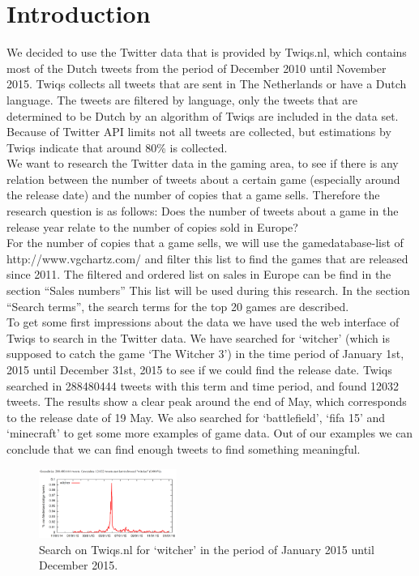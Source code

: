 \section{Introduction}
We decided to use the Twitter data that is provided by Twiqs.nl, which contains most of the Dutch tweets from the period of December 2010 until November 2015. Twiqs collects all tweets that are sent in The Netherlands or have a Dutch language. The tweets are filtered by language, only the tweets that are determined to be Dutch by an algorithm of Twiqs are included in the data set. Because of Twitter API limits not all tweets are collected, but estimations by Twiqs indicate that around 80\% is collected.\\
We want to research the Twitter data in the gaming area, to see if there is any relation between the number of tweets about a certain game (especially around the release date) and the number of copies that a game sells. Therefore the research question is as follows:
Does the number of tweets about a game in the release year relate to the number of copies sold in Europe?\\
For the number of copies that a game sells, we will use the gamedatabase-list of http://www.vgchartz.com/ and filter this list to find the games that are released since 2011. The filtered and ordered list on sales in Europe can be find in the section “Sales numbers” This list will be used during this research. In the section “Search terms”, the search terms for the top 20 games are described. \\
To get some first impressions about the data we have used the web interface of Twiqs to search in the Twitter data. We have searched for ‘witcher’ (which is supposed to catch the game ‘The Witcher 3’) in the time period of January 1st, 2015 until December 31st, 2015 to see if we could find the release date. Twiqs searched in 288480444 tweets with this term and time period, and found 12032 tweets. The results show a clear peak around the end of May, which corresponds to the release date of 19 May. We also searched for ‘battlefield’, ‘fifa 15’ and ‘minecraft’ to get some more examples of game data. Out of our examples we can conclude that we can find enough tweets to find something meaningful.\\
\begin{figure}[!ht]
	\centering
		\includegraphics[width=0.4\textwidth]{twiqswitcher}
	\caption{Search on Twiqs.nl for ‘witcher’ in the period of January 2015 until December 2015.}
\end{figure}
